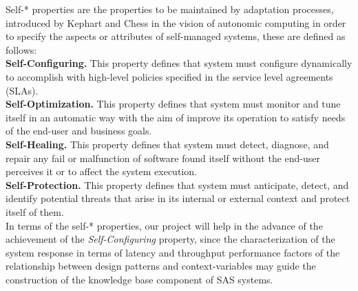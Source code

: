 
Self-* properties are the properties to be maintained by adaptation processes, introduced by Kephart and Chess in the vision of autonomic computing \cite{autonomiccomputing} in order to specify the aspects or attributes of self-managed systems, these are defined as follows: \\

\noindent\textbf{Self-Configuring.} This property defines that system must configure dynamically to accomplish with high-level policies specified in the service level agreements (SLAs). \\

\noindent\textbf{Self-Optimization.} This property defines that system must monitor and tune itself in an automatic way with the aim of improve its operation to satisfy needs of the end-user and business goals.\\

\noindent\textbf{Self-Healing.} This property defines that system must detect, diagnose, and repair any fail or malfunction of software found itself without the end-user perceives it or to affect the system execution. \\  

\noindent\textbf{Self-Protection.} 
This property defines that system must anticipate, detect, and identify potential threats that arise in its internal or external context and protect itself of them. \\

In terms of the self-* properties, our project will help in the advance of the achievement of the \textit{Self-Configuring} property, since the characterization of the system response in terms of latency and throughput performance factors of the relationship between design patterns and context-variables may guide the construction of the knowledge base component of SAS systems.



